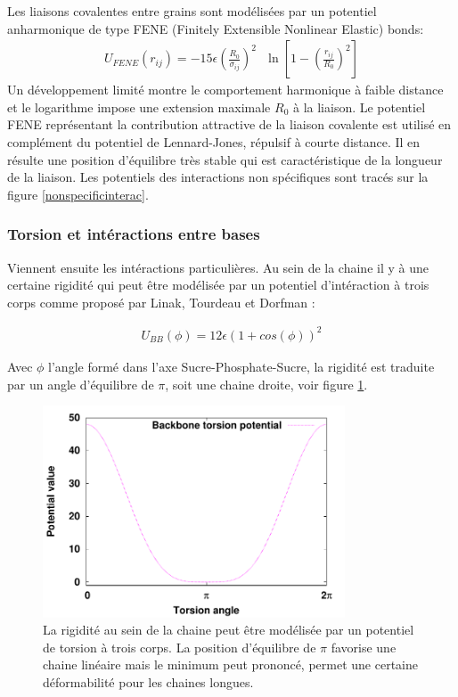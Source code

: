 Les liaisons covalentes entre grains sont modélisées par un potentiel anharmonique de type FENE (Finitely Extensible Nonlinear Elastic) bonds:
\begin{eqnarray}
U_{FENE}(r_{ij})= -15\epsilon \left(\frac{R_0}{\sigma_{ij}}\right)^2\text{ } \ln\left[1-\left(\frac{r_{ij}}{R_0}\right)^2\right]
\end{eqnarray}
Un développement limité montre le comportement harmonique à faible distance et le logarithme impose une extension maximale $R_0$ à la liaison. Le potentiel FENE représentant la contribution attractive de la liaison covalente est utilisé en complément du potentiel de Lennard-Jones, répulsif à courte distance. Il en résulte une position d'équilibre très stable qui est caractéristique de la longueur de la liaison. Les potentiels des interactions non spécifiques sont tracés sur la figure \ref{nonspecificinterac}.

\subsubsection{Torsion et intéractions entre bases}

Viennent ensuite les intéractions particulières. Au sein de la chaine il y à une certaine rigidité qui peut être modélisée par un potentiel d'intéraction à trois corps comme proposé par Linak, Tourdeau et Dorfman \cite{jchem}: 

\begin{eqnarray}
U_{BB}(\phi)= 12\epsilon \left( 1+cos(\phi)\right)^{2}
\end{eqnarray}

Avec $\phi$ l'angle formé dans l'axe Sucre-Phosphate-Sucre, la rigidité est traduite par un angle d'équilibre de $\pi$, soit une chaine droite, voir figure \ref{torsion}.

\begin{figure}[H]
\begin{center}
\includegraphics[width=0.8\textwidth]{backbone.pdf}

\caption[Potentiel de torsion]{La rigidité au sein de la chaine peut être modélisée par un potentiel de torsion à trois corps. La position d'équilibre de $\pi$ favorise une chaine linéaire mais le minimum peut prononcé, permet une certaine déformabilité pour les chaines longues.}
\label{torsion}
\end{center}
\end{figure}

